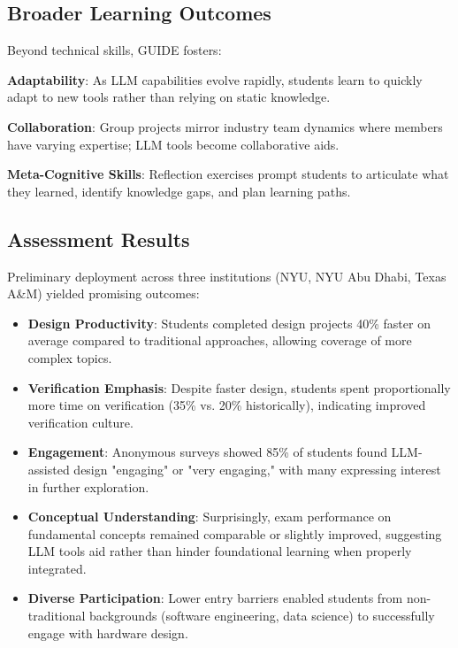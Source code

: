 \documentclass[10pt,conference]{IEEEtran}
\begin{document}
\subsection{Broader Learning Outcomes}

Beyond technical skills, GUIDE fosters:

\textbf{Adaptability}: As LLM capabilities evolve rapidly, students learn to quickly adapt to new tools rather than relying on static knowledge.

\textbf{Collaboration}: Group projects mirror industry team dynamics where members have varying expertise; LLM tools become collaborative aids.

\textbf{Meta-Cognitive Skills}: Reflection exercises prompt students to articulate what they learned, identify knowledge gaps, and plan learning paths.

\subsection{Assessment Results}

Preliminary deployment across three institutions (NYU, NYU Abu Dhabi, Texas A\&M) yielded promising outcomes:

\begin{itemize}
    \item \textbf{Design Productivity}: Students completed design projects 40\% faster on average compared to traditional approaches, allowing coverage of more complex topics.
    \item \textbf{Verification Emphasis}: Despite faster design, students spent proportionally more time on verification (35\% vs. 20\% historically), indicating improved verification culture.
    \item \textbf{Engagement}: Anonymous surveys showed 85\% of students found LLM-assisted design "engaging" or "very engaging," with many expressing interest in further exploration.
    \item \textbf{Conceptual Understanding}: Surprisingly, exam performance on fundamental concepts remained comparable or slightly improved, suggesting LLM tools aid rather than hinder foundational learning when properly integrated.
    \item \textbf{Diverse Participation}: Lower entry barriers enabled students from non-traditional backgrounds (software engineering, data science) to successfully engage with hardware design.
\end{itemize}
\end{document}
